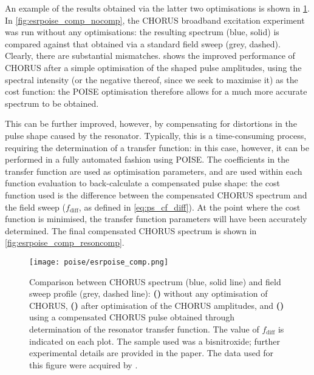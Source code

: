 An example of the results obtained via the latter two optimisations is shown in \cref{fig:esrpoise_comp}.
In \cref{fig:esrpoise_comp_nocomp}, the CHORUS broadband excitation experiment was run without any optimisations: the resulting spectrum (blue, solid) is compared against that obtained via a standard field sweep (grey, dashed).
Clearly, there are substantial mismatches.
 shows the improved performance of CHORUS after a simple optimisation of the shaped pulse amplitudes, using the spectral intensity (or the negative thereof, since we seek to maximise it) as the cost function: the POISE optimisation therefore allows for a much more accurate spectrum to be obtained.

This can be further improved, however, by compensating for distortions in the pulse shape caused by the resonator.
Typically, this is a time-consuming process, requiring the determination of a transfer function: in this case, however, it can be performed in a fully automated fashion using POISE.
The coefficients in the transfer function are used as optimisation parameters, and are used within each function evaluation to back-calculate a compensated pulse shape: the cost function used is the difference between the compensated CHORUS spectrum and the field sweep ($f_\text{diff}$, as defined in \cref{eq:ps_cf_diff}).
At the point where the cost function is minimised, the transfer function parameters will have been accurately determined.
The final compensated CHORUS spectrum is shown in \cref{fig:esrpoise_comp_resoncomp}.

\begin{figure}[htb]
    \centering
    \texttt{[image: poise/esrpoise\_comp.png]}%
    {\label{fig:esrpoise_comp_nocomp}}%
    {\label{fig:esrpoise_comp_ampcomp}}%
    {\label{fig:esrpoise_comp_resoncomp}}%
    \caption[Comparison between CHORUS spectrum and field sweep before and after optimisation]{
        Comparison between CHORUS spectrum (blue, solid line) and field sweep profile (grey, dashed line):
        \textbf{()} without any optimisation of CHORUS,
        \textbf{()} after optimisation of the CHORUS amplitudes, and
        \textbf{()} using a compensated CHORUS pulse obtained through determination of the resonator transfer function.
        The value of $f_\text{diff}$ is indicated on each plot.
        The sample used was a bisnitroxide; further experimental details are provided in the paper.\autocite{Verstraete2022CC}
        The data used for this figure were acquired by \JBV{}.
    }
    \label{fig:esrpoise_comp}
\end{figure}
